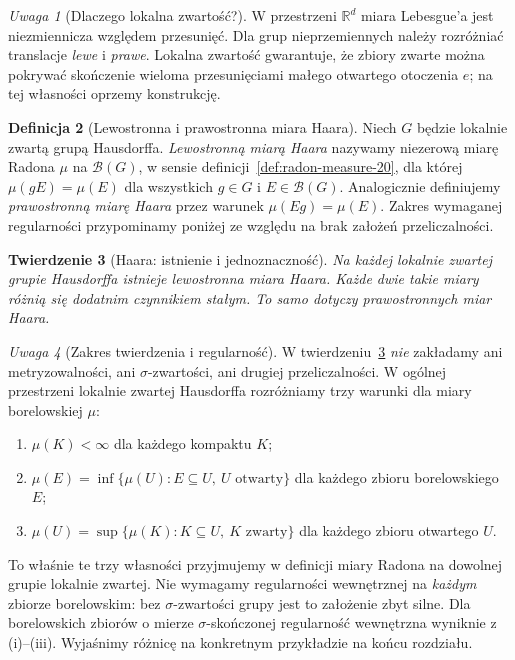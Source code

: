 \documentclass[11pt,a4paper,oneside]{book}
\numberwithin{equation}{chapter}
\theoremstyle{plain}
\newtheorem{twierdzenie}{Twierdzenie}[chapter]
\theoremstyle{definition}
\newtheorem{definicja}[twierdzenie]{Definicja}
\theoremstyle{remark}
\newtheorem{uwaga}[twierdzenie]{Uwaga}
\begin{document}
\begin{uwaga}[Dlaczego lokalna zwartość?]
W przestrzeni $\mathbb R^d$ miara Lebesgue'a jest niezmiennicza
względem przesunięć. Dla grup nieprzemiennych należy rozróżniać
translacje \emph{lewe} i \emph{prawe}. Lokalna zwartość gwarantuje,
że zbiory zwarte można pokrywać skończenie wieloma przesunięciami
małego otwartego otoczenia $e$; na tej własności oprzemy konstrukcję.
\end{uwaga}

\begin{definicja}[Lewostronna i prawostronna miara Haara]
\label{def:haar-23}
Niech $G$ będzie lokalnie zwartą grupą Hausdorffa.
\emph{Lewostronną miarą Haara} nazywamy niezerową miarę Radona
$\mu$ na $\mathcal B(G)$, w sensie definicji~\ref{def:radon-measure-20},
dla której $\mu(gE)=\mu(E)$ dla wszystkich $g\in G$
i $E\in\mathcal B(G)$. Analogicznie definiujemy
\emph{prawostronną miarę Haara} przez warunek
$\mu(Eg)=\mu(E)$. Zakres wymaganej regularności
przypominamy poniżej ze względu na brak założeń przeliczalności.
\end{definicja}

\begin{twierdzenie}[Haara: istnienie i jednoznaczność]
\label{thm:haar-main-23}
Na każdej lokalnie zwartej grupie Hausdorffa istnieje
lewostronna miara Haara. Każde dwie takie miary różnią się
dodatnim czynnikiem stałym. To samo dotyczy prawostronnych miar
Haara.
\end{twierdzenie}

\begin{uwaga}[Zakres twierdzenia i regularność]
W twierdzeniu~\ref{thm:haar-main-23} \emph{nie} zakładamy ani
metryzowalności, ani $\sigma$-zwartości, ani drugiej przeliczalności.
W ogólnej przestrzeni lokalnie zwartej Hausdorffa rozróżniamy
trzy warunki dla miary borelowskiej $\mu$:
\begin{enumerate}[label=(\roman*)]
\item $\mu(K)<\infty$ dla każdego kompaktu $K$;
\item $\mu(E)=\inf\{\mu(U):E\subseteq U,\ U\text{ otwarty}\}$
      dla każdego zbioru borelowskiego $E$;
\item $\mu(U)=\sup\{\mu(K):K\subseteq U,\ K\text{ zwarty}\}$
      dla każdego zbioru otwartego $U$.
\end{enumerate}
To właśnie te trzy własności przyjmujemy w definicji miary Radona
na dowolnej grupie lokalnie zwartej. Nie wymagamy regularności
wewnętrznej na \emph{każdym} zbiorze borelowskim: bez
$\sigma$-zwartości grupy jest to założenie zbyt silne.
Dla borelowskich zbiorów o mierze $\sigma$-skończonej
regularność wewnętrzna wyniknie z (i)--(iii).
Wyjaśnimy różnicę na konkretnym przykładzie na końcu rozdziału.
\end{uwaga}
\end{document}
